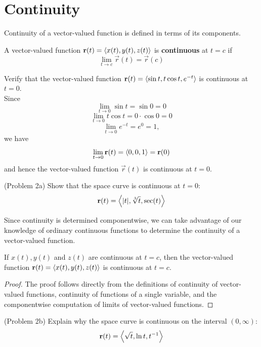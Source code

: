 \documentclass[handout]{ximera}
\begin{document}
\section{Continuity}

Continuity of a vector-valued function is defined in terms of its components.

\begin{definition}
A vector-valued function $\mathbf r(t) = \left\langle x(t), y(t), z(t)\right\rangle$ is
\textbf{continuous} at $t = c$ if
\[
\lim_{t \to c} \vec r(t) = \vec r(c)
\]
\end{definition}


\begin{example}[Example 2]
Verify that the vector-valued function $\mathbf r(t) = \left\langle \sin t, t \cos t, e^{-t}\right\rangle$ is continuous at $t = 0$.\\
Since
\[
\lim_{t \to 0} \sin t =  \sin 0 = 0
\]
\[
\lim_{t \to 0} t \cos t =  0 \cdot \cos 0 = 0
\]
\[
\lim_{t \to 0} e^{-t} =  e^0 = 1,
\]
we have
\[
\lim_{t \to 0} \mathbf r(t) = \left\langle 0, 0, 1\right\rangle = \mathbf r(0)
\]
and hence the vector-valued function $\vec r(t)$ is continuous at $t = 0$.

\end{example}

\begin{problem}(Problem 2a)
Show that the space curve is continuous at $t = 0$:
\[
\mathbf r(t) = \left\langle |t|,\sqrt[3] t, \sec(t)\right\rangle
\]
\end{problem}

Since continuity is determined componentwise, we can take advantage of our knowledge of ordinary
continuous functions to determine the continuity of a vector-valued function.

\begin{proposition}[Continuity]
If $x(t), y(t)$ and $z(t)$ are continuous at $t = c$, then the vector-valued function $\mathbf r(t) = \left\langle x(t), y(t), z(t)\right\rangle$
is continuous at $t = c$.
\end{proposition}
\begin{proof}
The proof follows directly from the definitions of continuity of vector-valued functions, continuity of functions of a single 
variable, and the componentwise computation of limits of vector-valued functions.
\end{proof}

\begin{problem}(Problem 2b)
Explain why the space curve is continuous on the interval $(0, \infty)$:
\[
\mathbf r(t) = \left\langle  \sqrt t, \ln t, t^{-1}\right\rangle
\]
\end{problem}
\end{document}

